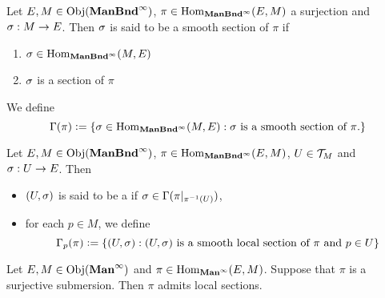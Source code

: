 \documentclass{book}
\begin{document}
	\begin{defn} 
		Let $E, M \in \operatorname{Obj}(\operatorname*{\text{\textbf{ManBnd}}^{\infty}})$, $\pi \in \operatorname{Hom}_{\operatorname*{\text{\textbf{ManBnd}}^{\infty}}}(E, M)$ a surjection and $\sigma: M \rightarrow E$. Then $\sigma$ is said to be a smooth section of $\pi$ if 
		\begin{enumerate}
			\item $\sigma \in \operatorname{Hom}_{\operatorname*{\text{\textbf{ManBnd}}^{\infty}}}(M, E)$
			\item $\sigma$ is a section of $\pi$
		\end{enumerate}
		We define $$\Gamma(\pi) \vcentcolon= \{\sigma \in \operatorname{Hom}_{\operatorname*{\text{\textbf{ManBnd}}^{\infty}}}(M, E): \text{$\sigma$ is a smooth section of $\pi$.}\}$$
	\end{defn}
	
	\begin{defn} 
		Let $E, M \in \operatorname{Obj}(\operatorname*{\text{\textbf{ManBnd}}^{\infty}})$, $\pi \in \operatorname{Hom}_{\operatorname*{\text{\textbf{ManBnd}}^{\infty}}}(E, M)$, $U \in \mathcal{T}_M$ and $\sigma : U \rightarrow E$. Then 
		\begin{itemize}
			\item $(U, \sigma)$ is said to be a  if $\sigma \in \Gamma(\pi|_{\pi^{-1}(U)})$, 
			\item for each $p \in M$, we define 
			$$\Gamma_p(\pi) \vcentcolon= \{(U, \sigma): \text{$(U, \sigma)$ is a smooth local section of $\pi$ and $p \in U$}\}$$
		\end{itemize}
	\end{defn}

	\begin{ex} 
		Let $E, M \in \operatorname{Obj}(\operatorname*{\text{\textbf{Man}}^{\infty}})$ and $\pi \in \operatorname{Hom}_{\operatorname*{\text{\textbf{Man}}^{\infty}}}(E, M)$. Suppose that $\pi$ is a surjective submersion. Then $\pi$ admits local sections. 
	\end{ex}
\end{document}
